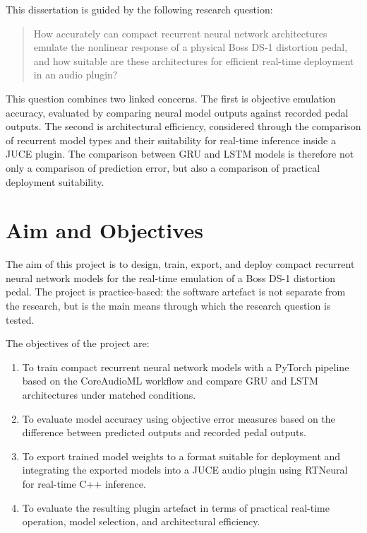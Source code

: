 This dissertation is guided by the following research question:

\begin{quote}
  How accurately can compact recurrent neural network architectures emulate the nonlinear response of a physical Boss DS-1 distortion pedal, and how suitable are these architectures for efficient real-time deployment in an audio plugin?
\end{quote}

This question combines two linked concerns. The first is objective emulation accuracy, evaluated by comparing neural model outputs against recorded pedal outputs. The second is architectural efficiency, considered through the comparison of recurrent model types and their suitability for real-time inference inside a JUCE plugin. The comparison between GRU and LSTM models is therefore not only a comparison of prediction error, but also a comparison of practical deployment suitability.

\section{Aim and Objectives}
\label{sec:introduction-aim-objectives}

The aim of this project is to design, train, export, and deploy compact recurrent neural network models for the real-time emulation of a Boss DS-1 distortion pedal. The project is practice-based: the software artefact is not separate from the research, but is the main means through which the research question is tested.

The objectives of the project are:

\begin{enumerate}

  \item To train compact recurrent neural network models with a PyTorch pipeline based on the CoreAudioML workflow and compare GRU and LSTM architectures under matched conditions.

  \item To evaluate model accuracy using objective error measures based on the difference between predicted outputs and recorded pedal outputs.

  \item To export trained model weights to a format suitable for deployment and integrating the exported models into a JUCE audio plugin using RTNeural for real-time C++ inference.

  \item To evaluate the resulting plugin artefact in terms of practical real-time operation, model selection, and architectural efficiency.
\end{enumerate}

